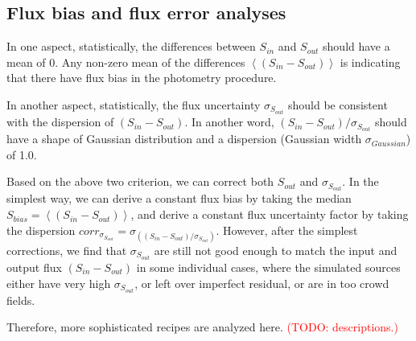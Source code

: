 \documentclass[11pt,a4paper]{article}
\begin{document}
\subsection{Flux bias and flux error analyses}
\label{Band100_simanalyses}

In one aspect, statistically, the differences between $S_{in}$ and $S_{out}$ should have a mean of 0. Any non-zero mean of the differences $\left<(S_{in}-S_{out})\right>$ is indicating that there have flux bias in the photometry procedure. 

In another aspect, statistically, the flux uncertainty $\sigma_{S_{out}}$ should be consistent with the dispersion of $(S_{in}-S_{out})$. In another word, $(S_{in}-S_{out})/\sigma_{S_{out}}$ should have a shape of Gaussian distribution and a dispersion (Gaussian width $\sigma_{Gaussian}$) of 1.0. 

Based on the above two criterion, we can correct both $S_{out}$ and $\sigma_{S_{out}}$. In the simplest way, we can derive a constant flux bias by taking the median $S_{bias}=\left<(S_{in}-S_{out})\right>$, and derive a constant flux uncertainty factor by taking the dispersion ${corr}_{\sigma_{S_{out}}}=\sigma_{\left((S_{in}-S_{out})/\sigma_{S_{out}}\right)}$. However, after the simplest corrections, we find that $\sigma_{S_{out}}$ are still not good enough to match the input and output flux $(S_{in}-S_{out})$ in some individual cases, where the simulated sources either have very high $\sigma_{S_{out}}$, or left over imperfect residual, or are in too crowd fields. 

Therefore, more sophisticated recipes are analyzed here. \textcolor{red}{(TODO: descriptions.)}
\end{document}
